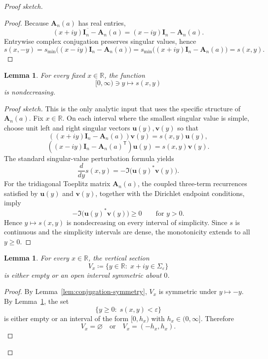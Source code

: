 \documentclass[11pt]{article}
\newtheorem{lemma}[theorem]{Lemma}
\begin{document}
\begin{proof}[Proof sketch]
\begin{proof}
Because \(\mathbf A_n(a)\) has real entries,
\[
\overline{(x+iy)\mathbf I_n-\mathbf A_n(a)}
=
(x-iy)\mathbf I_n-\mathbf A_n(a).
\]
Entrywise complex conjugation preserves singular values, hence
\[
s(x,-y)
=
s_{\min}\!\bigl((x-iy)\mathbf I_n-\mathbf A_n(a)\bigr)
=
s_{\min}\!\bigl((x+iy)\mathbf I_n-\mathbf A_n(a)\bigr)
=
s(x,y).
\]
\end{proof}

\begin{lemma}\label{lem:vertical-monotonicity}
For every fixed \(x\in\mathbb R\), the function
\[
[0,\infty)\ni y\longmapsto s(x,y)
\]
is nondecreasing.
\end{lemma}

\begin{proof}[Proof sketch]
This is the only analytic input that uses the specific structure of
\(\mathbf A_n(a)\).
Fix \(x\in\mathbb R\).
On each interval where the smallest singular value is simple, choose unit left
and right singular vectors \(\mathbf u(y),\mathbf v(y)\) so that
\[
((x+iy)\mathbf I_n-\mathbf A_n(a))\mathbf v(y)=s(x,y)\mathbf u(y),
\]
\[
((x-iy)\mathbf I_n-\mathbf A_n(a)^{\mathsf T})\mathbf u(y)=s(x,y)\mathbf v(y).
\]
The standard singular-value perturbation formula yields
\[
\frac{d}{dy}s(x,y)
=
-\Im\!\bigl(\mathbf u(y)^*\mathbf v(y)\bigr).
\]
For the tridiagonal Toeplitz matrix \(\mathbf A_n(a)\), the coupled three-term
recurrences satisfied by \(\mathbf u(y)\) and \(\mathbf v(y)\), together with the
Dirichlet endpoint conditions, imply
\[
-\Im\!\bigl(\mathbf u(y)^*\mathbf v(y)\bigr)\ge 0
\qquad
\text{for }y>0.
\]
Hence \(y\mapsto s(x,y)\) is nondecreasing on every interval of simplicity.
Since \(s\) is continuous and the simplicity intervals are dense, the monotonicity
extends to all \(y\ge 0\).
\end{proof}

\begin{lemma}\label{lem:vertical-sections}
For every \(x\in\mathbb R\), the vertical section
\[
V_x
\coloneqq
\{y\in\mathbb R:\; x+iy\in\Sigma_\varepsilon\}
\]
is either empty or an open interval symmetric about \(0\).
\end{lemma}

\begin{proof}
By Lemma~\ref{lem:conjugation-symmetry}, \(V_x\) is symmetric under \(y\mapsto -y\).
By Lemma~\ref{lem:vertical-monotonicity}, the set
\[
\{y\ge 0:\; s(x,y)<\varepsilon\}
\]
is either empty or an interval of the form \([0,h_x)\) with \(h_x\in(0,\infty]\).
Therefore
\[
V_x=
\varnothing
\quad\text{or}\quad
V_x=(-h_x,h_x).
\]
\end{proof}


\end{proof}
\end{document}
